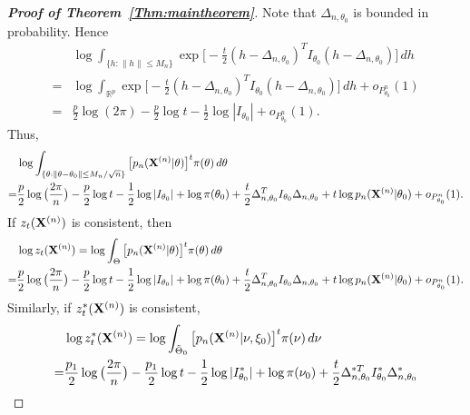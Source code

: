 \documentclass[3p]{elsarticle}
\theoremstyle{plain}
\theoremstyle{definition}
\theoremstyle{remark}
\begin{document}
\begin{proof}[\textbf{Proof of Theorem~\ref{Thm:maintheorem}}]
        Note that $\Delta_{n,\theta_0}$ is bounded in probability.
        Hence
        $$
            \begin{aligned}
            &\log \int_{\{h:\|h\|\leq M_n\}}\exp\big[ -\frac{t}{2}(h-\Delta_{n,\theta_0})^T I_{\theta_0}(h-\Delta_{n,\theta_0})\big] \, dh
                \\
                =&
                \log \int_{\mathbb{R}^p}\exp\big[ -\frac{t}{2}(h-\Delta_{n,\theta_0})^T I_{\theta_0}(h-\Delta_{n,\theta_0})\big] \, dh+o_{P^n_{\theta_0}}(1)
                \\
                =&
                \frac{p}{2}\log(2\pi)-\frac{p}{2}\log t-\frac{1}{2}\log |I_{\theta_0}|
+o_{P^n_{\theta_0}}(1).
            \end{aligned}
        $$
        Thus,
$$
        \begin{aligned}
            &\log \int_{\{\theta:\|\theta-\theta_0\|\leq M_n/\sqrt{n}\}}\big[ p_n(\BX^{(n)}|\theta)\big]^t \pi(\theta)\, d\theta\\
            =
            &
                \frac{p}{2}\log\big(\frac{2\pi}{n}\big)-\frac{p}{2}\log t-\frac{1}{2}\log |I_{\theta_0}|
                +\log \pi(\theta_0)
             +
            \frac{t}{2}\Delta_{n,\theta_0}^T I_{\theta_0}\Delta_{n,\theta_0}
            +
            t\log p_n(\BX^{(n)}|\theta_0)
            +o_{P^n_{\theta_0}}(1).
        \end{aligned}
        $$
If $z_t(\BX^{(n)})$ is consistent, then
$$
        \begin{aligned}
            &\log z_t(\BX^{(n)})=\log \int_{\Theta}\big[ p_n(\BX^{(n)}|\theta)\big]^t \pi(\theta)\, d\theta\\
            =
            &
                \frac{p}{2}\log\big(\frac{2\pi}{n}\big)-\frac{p}{2}\log t-\frac{1}{2}\log |I_{\theta_0}|
                +\log \pi(\theta_0)
             +
            \frac{t}{2}\Delta_{n,\theta_0}^T I_{\theta_0}\Delta_{n,\theta_0}
            +
            t\log p_n(\BX^{(n)}|\theta_0)
            +o_{P^n_{\theta_0}}(1).
        \end{aligned}
        $$
Similarly, if $z_t^*(\BX^{(n)})$ is consistent,
$$
\begin{aligned}
    &\log z_t^* (\BX^{(n)})=\log \int_{\tilde{\Theta}_0}\big[ p_n(\BX^{(n)}|\nu,\xi_0)\big]^t \pi(\nu)\, d\nu\\
    =&
                \frac{p_1}{2}\log\big(\frac{2\pi}{n}\big)-\frac{p_1}{2}\log t-\frac{1}{2}\log |I_{\theta_0}^*|
                +\log \pi(\nu_0)
             +
            \frac{t}{2}\Delta_{n,\theta_0}^{*T} I^*_{\theta_0}\Delta^*_{n,\theta_0}

\end{aligned}$$
\end{proof}
\end{document}
